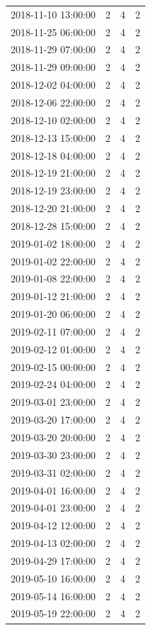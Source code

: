 \begin{tabular}{lrrr}
2018-11-10 13:00:00 & 2 & 4 & 2 \\
2018-11-25 06:00:00 & 2 & 4 & 2 \\
2018-11-29 07:00:00 & 2 & 4 & 2 \\
2018-11-29 09:00:00 & 2 & 4 & 2 \\
2018-12-02 04:00:00 & 2 & 4 & 2 \\
2018-12-06 22:00:00 & 2 & 4 & 2 \\
2018-12-10 02:00:00 & 2 & 4 & 2 \\
2018-12-13 15:00:00 & 2 & 4 & 2 \\
2018-12-18 04:00:00 & 2 & 4 & 2 \\
2018-12-19 21:00:00 & 2 & 4 & 2 \\
2018-12-19 23:00:00 & 2 & 4 & 2 \\
2018-12-20 21:00:00 & 2 & 4 & 2 \\
2018-12-28 15:00:00 & 2 & 4 & 2 \\
2019-01-02 18:00:00 & 2 & 4 & 2 \\
2019-01-02 22:00:00 & 2 & 4 & 2 \\
2019-01-08 22:00:00 & 2 & 4 & 2 \\
2019-01-12 21:00:00 & 2 & 4 & 2 \\
2019-01-20 06:00:00 & 2 & 4 & 2 \\
2019-02-11 07:00:00 & 2 & 4 & 2 \\
2019-02-12 01:00:00 & 2 & 4 & 2 \\
2019-02-15 00:00:00 & 2 & 4 & 2 \\
2019-02-24 04:00:00 & 2 & 4 & 2 \\
2019-03-01 23:00:00 & 2 & 4 & 2 \\
2019-03-20 17:00:00 & 2 & 4 & 2 \\
2019-03-20 20:00:00 & 2 & 4 & 2 \\
2019-03-30 23:00:00 & 2 & 4 & 2 \\
2019-03-31 02:00:00 & 2 & 4 & 2 \\
2019-04-01 16:00:00 & 2 & 4 & 2 \\
2019-04-01 23:00:00 & 2 & 4 & 2 \\
2019-04-12 12:00:00 & 2 & 4 & 2 \\
2019-04-13 02:00:00 & 2 & 4 & 2 \\
2019-04-29 17:00:00 & 2 & 4 & 2 \\
2019-05-10 16:00:00 & 2 & 4 & 2 \\
2019-05-14 16:00:00 & 2 & 4 & 2 \\
2019-05-19 22:00:00 & 2 & 4 & 2 \\

\end{tabular}
